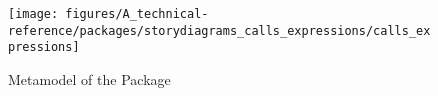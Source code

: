 %
%


\begin{figure}[htbp]
  \centering
  \texttt{[image: figures/A\_technical-reference/packages/storydiagrams\_calls\_expressions/calls\_expressions]}
  \caption{Metamodel of the  Package}
  \label{fig:MM:calls:expressions}
\end{figure}